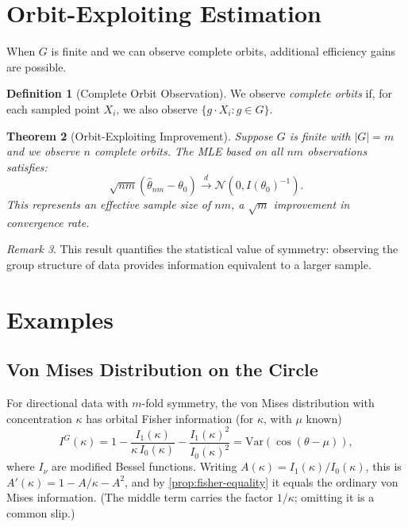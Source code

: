 \documentclass[11pt,twoside,openright]{book}
\theoremstyle{plain}
\newtheorem{theorem}{Theorem}[chapter]
\theoremstyle{definition}
\newtheorem{definition}[theorem]{Definition}
\theoremstyle{remark}
\newtheorem{remark}[theorem]{Remark}
\newcommand{\calN}{\mathcal{N}}
\newcommand{\var}{\mathrm{Var}}
\begin{document}
\section{Orbit-Exploiting Estimation}

When $G$ is finite and we can observe complete orbits, additional efficiency gains are possible.

\begin{definition}[Complete Orbit Observation]
We observe \emph{complete orbits} if, for each sampled point $X_i$, we also observe $\{g \cdot X_i : g \in G\}$.
\end{definition}

\begin{theorem}[Orbit-Exploiting Improvement]
\label{thm:orbit-improvement}
Suppose $G$ is finite with $|G| = m$ and we observe $n$ complete orbits. The MLE based on all $nm$ observations satisfies:
\begin{equation}
\sqrt{nm}(\hat{\theta}_{nm} - \theta_0) \xrightarrow{d} \calN(0, I(\theta_0)^{-1}).
\label{eq:orbit-improvement}
\end{equation}
This represents an effective sample size of $nm$, a $\sqrt{m}$ improvement in convergence rate.
\end{theorem}

\begin{remark}
This result quantifies the statistical value of symmetry: observing the group structure of data provides information equivalent to a larger sample.
\end{remark}

\section{Examples}

\subsection{Von Mises Distribution on the Circle}

For directional data with $m$-fold symmetry, the von Mises distribution with concentration $\kappa$ has orbital Fisher information (for $\kappa$, with $\mu$ known)
\[
I^G(\kappa) = 1 - \frac{I_1(\kappa)}{\kappa\,I_0(\kappa)} - \frac{I_1(\kappa)^2}{I_0(\kappa)^2}
= \var(\cos(\theta-\mu)),
\]
where $I_\nu$ are modified Bessel functions. Writing $A(\kappa)=I_1(\kappa)/I_0(\kappa)$, this is $A'(\kappa)=1-A/\kappa-A^2$, and by \cref{prop:fisher-equality} it equals the ordinary von Mises information. (The middle term carries the factor $1/\kappa$; omitting it is a common slip.)
\end{document}
